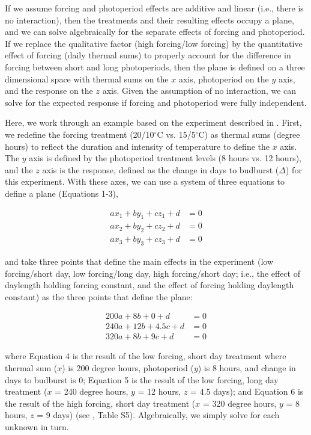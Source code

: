 \documentclass[11pt]{article}
\begin{document}
If we assume forcing and photoperiod effects are additive and linear (i.e., there is no interaction), then the treatments and their resulting effects occupy a plane, and we can solve algebraically for the separate effects of forcing and photoperiod.  If we replace the qualitative factor (high forcing/low forcing) by the quantitative effect of forcing (daily thermal sums) to properly account for the difference in forcing between short and long photoperiods, then the plane is defined on a three dimensional space with thermal sums on the $x$ axis, photoperiod on the $y$ axis, and the response on the $z$ axis. Given the assumption of no interaction, we can solve for the expected response if forcing and photoperiod were fully independent. 

Here, we work through an example based on the experiment described in \cite{Flynn2018}. First, we redefine the forcing treatment (20/10$^{\circ}$C vs. 15/5$^{\circ}$C) as thermal sums (degree hours) to reflect the duration and intensity of temperature to define the $x$ axis. The $y$ axis is defined by the photoperiod treatment levels (8 hours vs. 12 hours), and the $z$ axis is the response, defined as the change in days to budburst ($\Delta$) for this experiment. With these axes, we can use a system of three equations to define a plane (Equations 1-3), 

\begin{align}
ax_1+by_1+cz_1+d & =0\\
ax_2+by_2+cz_2+d & =0\\
ax_3+by_3+cz_3+d & =0
\end{align}

and take three points that define the main effects in the experiment (low forcing/short day, low forcing/long day, high forcing/short day; i.e., the effect of daylength holding forcing constant, and the effect of forcing holding daylength constant) as the three points that define the plane:

\begin{align}
200a + 8b + 0 + d &= 0\\
240a + 12b+4.5c + d &=0\\
320a + 8b + 9c+ d &=0
\end{align}

where Equation 4 is the result of the low forcing, short day treatment where thermal sum ($x$) is 200 degree hours, photoperiod ($y$) is 8 hours, and change in days to budburst is 0; Equation 5 is the result of the low forcing, long day treatment ($x$ = 240 degree hours, $y$ = 12 hours, $z$ = 4.5 days); and Equation 6 is the result of the high forcing, short day treatment ($x$ = 320 degree hours, $y$ = 8 hours, $z$ = 9 days) (see \citet{Flynn2018}, Table S5).  Algebraically, we simply solve for each unknown in turn. 
\end{document}
